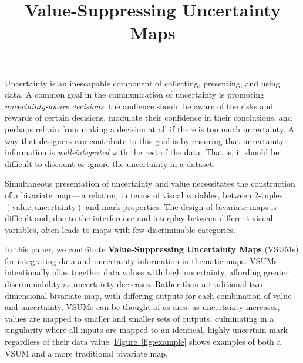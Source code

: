 \documentclass{vgtc}                          %
\title{Value-Suppressing Uncertainty Maps}
\newcommand{\figref}[1]{\hyperref[#1]{Figure~\ref*{#1}}}
\begin{document}


\maketitle




Uncertainty is an inescapable component of collecting, presenting, and using data. A common goal in the communication of uncertainty is promoting \emph{uncertainty-aware decisions}: the audience should be aware of the risks and rewards of certain decisions, modulate their confidence in their conclusions, and perhaps refrain from making a decision at all if there is too much uncertainty.  A way that designers can contribute to this goal is by ensuring that uncertainty information is \emph{well-integrated} with the rest of the data. That is, it should be difficult to discount or ignore the uncertainty in a dataset.

Simultaneous presentation of uncertainty and value necessitates the construction of a bivariate map\,---\,a relation, in terms of visual variables, between 2-tuples $(\text{value}, \text{uncertainty})$ and mark properties. The design of bivariate maps is difficult and, due to the interference and interplay between different visual variables, often leads to maps with few discriminable categories.

In this paper, we contribute \textbf{Value-Suppressing Uncertainty Maps} (VSUMs) for integrating data and uncertainty information in thematic maps. VSUMs intentionally alias together data values with high uncertainty, affording greater discriminability as uncertainty decreases. Rather than a traditional two-dimensional bivariate map, with differing outputs for each combination of value and uncertainty, VSUMs can be thought of as arcs: as uncertainty increases, values are mapped to smaller and smaller sets of outputs, culminating in a singularity where all inputs are mapped to an identical, highly uncertain mark regardless of their data value. \figref{fig:example} shows examples of both a VSUM and a more traditional bivariate map.
\end{document}
